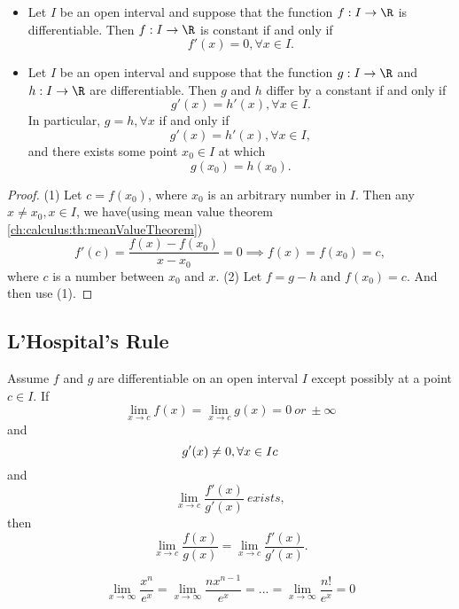 \begin{refsection}
\begin{lemma}\cite[104]{fitzpatrick2006advanced}\label{ch:calculus:th:IdentityCriterionForDifferentiableFunctions}\hfill
\begin{itemize}
	\item Let $I$ be an open interval and suppose that the function $f:I\to \R$ is differentiable. Then $f:I\to \R$ is constant if and only if
	$$f'(x) = 0, \forall x\in I.$$
	\item Let $I$ be an open interval and suppose that the function $g:I\to \R$ and $h:I\to \R$ are differentiable. 
	Then $g$ and $h$ differ by a constant if and only if 
	$$g'(x) = h'(x), \forall x\in I.$$
	In particular, $g= h, \forall x$ if and only if
	$$g'(x) = h'(x), \forall x\in I,$$
	and there exists some point $x_0\in I$ at which
	$$g(x_0) = h(x_0).$$
\end{itemize}	
\end{lemma}
\begin{proof}
(1)	
Let $c = f(x_0)$, where $x_0$ is an arbitrary number in $I$. Then any $x\neq x_0, x\in I$, we have(using mean value theorem \autoref{ch:calculus:th:meanValueTheorem})
$$f'(c) = \frac{f(x)-f(x_0)}{x-x_0} =0 \implies f(x)= f(x_0) =c,$$
where $c$ is a number between $x_0$ and $x$.
(2) Let $f = g - h$ and $f(x_0) = c.$ And then use (1).
\end{proof}


 
\subsection{L'Hospital's Rule}
\begin{theorem}
Assume $f$ and $g$ are differentiable on an open interval $I$ except possibly at a point $c\in I$. If 
$$\lim_{x\to c} f(x) = \lim_{x\to c} g(x) = 0 ~or~ \pm \infty$$
and
$$g'(x)\neq 0, \forall x\in I\\c$$
and
$$\lim_{x\to c} \frac{f'(x)}{g'(x)} ~exists,$$
then
$$\lim_{x\to c}\frac{f(x)}{g(x)} = \lim_{x\to c} \frac{f'(x)}{g'(x)}.$$		
\end{theorem}

\begin{example}
	$$\lim_{x\to \infty} \frac{x^n}{e^x} = \lim_{x\to \infty} \frac{nx^{n-1}}{e^x} = ... = \lim_{x\to \infty} \frac{n!}{e^x} = 0$$
\end{example}


\end{refsection}

